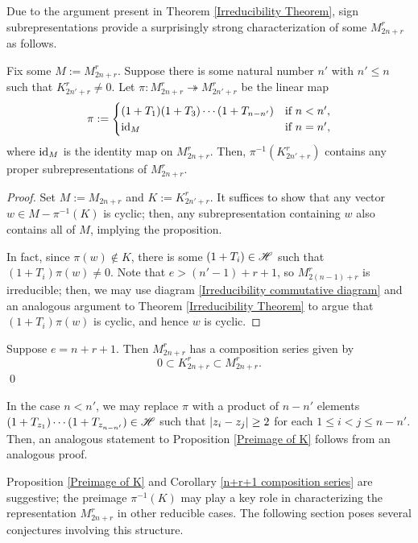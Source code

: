 \documentclass{amsart}
\begin{document}
 Due to the argument present in Theorem \ref{Irreducibility Theorem}, sign subrepresentations provide a surprisingly strong characterization of some $M_{2n + r}^r$ as follows.
 \begin{proposition}\label{Preimage of K}
 	Fix some $M := M_{2n + r}^r$.
 	Suppose there is some natural number $n'$ with $n' \leq n$ such that $K_{2n' + r}^r \neq 0$.
 	Let $\pi:M_{2n + r}^r \twoheadrightarrow M_{2n' + r}^r$ be the linear map
 	\[
 	\pi := \begin{cases}
 	(1 + T_1)(1 + T_3)\cdots(1 + T_{n-n'}) & \text{if } n < n',\\
 	\operatorname{id}_{M} & \text{if } n = n',
 	\end{cases}
 	\]
  where $\operatorname{id}_{M}$ is the identity map on $M_{2n + r}^r$.
  Then, $\pi^{-1}(K_{2n' + r}^r)$ contains any proper subrepresentations of $M_{2n + r}^r$.
 \end{proposition}
 \begin{proof}
   Set $M := M_{2n + r}$ and $K := K_{2n' + r}^r$.
  It suffices to show that any vector $w \in M - \pi^{-1}(K)$ is cyclic;
 	then, any subrepresentation containing $w$ also contains all of $M$, implying the proposition.
 	
 	In fact, since $\pi(w) \notin K$, there is some $(1 + T_i) \in \mathscr{H}$ such that $(1 + T_i)\pi(w) \neq 0$.
 	Note that $e > (n'-1) + r + 1$, so $M_{2(n-1) + r}^r$ is irreducible;
 	then, we may use diagram \eqref{Irreducibility commutative diagram} and an analogous argument to Theorem \ref{Irreducibility Theorem} to argue that $(1 + T_i)\pi(w)$ is cyclic, and hence $w$ is cyclic.
 \end{proof}
 \begin{corollary}\label{n+r+1 composition series}
 	Suppose $e = n + r + 1$.
 	Then $M_{2n + r}^r$ has a composition series given by
 	\[
    0 \subset K_{2n + r}^r \subset M_{2n + r}^r.
 	\]\qed
 \end{corollary}

 \begin{remark}
   In the case $n < n'$, we may replace $\pi$ with a product of $n-n'$ elements $(1 + T_{z_1})\cdots(1 + T_{z_{n-n'}}) \in \mathscr{H}$ such that $\left| z_i - z_j \right| \geq 2$ for each $1 \leq i < j \leq n-n'$.
   Then, an analogous statement to Proposition \ref{Preimage of K} follows from an analogous proof.
 \end{remark}
 
 Proposition \ref{Preimage of K} and Corollary \ref{n+r+1 composition series} are suggestive;
 the preimage $\pi^{-1}(K)$ may play a key role in characterizing the representation $M_{2n + r}^r$ in other reducible cases.
 The following section poses several conjectures involving this structure.
  
\end{document}
